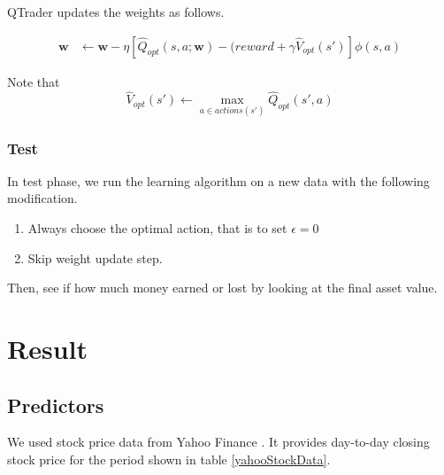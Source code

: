 \documentclass[twocolumn,10pt]{asme2ej}
\newcommand{\vect}[1]{\boldsymbol{#1}}
\begin{document}
QTrader updates the weights as follows.

\begin{align*}
\vect{w} &\gets \vect{w} - \eta[\hat{Q}_{opt}(s, a;\vect{w}) - (reward + \gamma \hat{V}_{opt}(s')]\phi(s,a)
\end{align*}

Note that
\[
  \hat{V}_{opt}(s') \gets \max_{a \in actions(s')}\hat{Q}_{opt}(s', a)
\]


\subsubsection{Test}

In test phase, we run the learning algorithm on a new data with the
following modification.

\begin{enumerate}
\item Always choose the optimal action, that is to set $\epsilon = 0$
\item Skip weight update step.
\end{enumerate}

Then, see if how much money earned or lost by looking at the final
asset value.


\section{Result}

\subsection{Predictors}

We used stock price data from Yahoo Finance
\cite{web:yahoo_finance}. It provides day-to-day closing stock price
for the period shown in table \ref{yahooStockData}.
\end{document}
